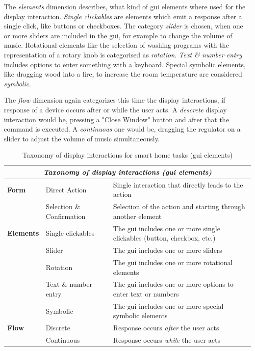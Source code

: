 \documentclass[sigchi]{acmart}
\begin{document}
	The \textit{elements} dimension describes, what kind of \ac{gui} elements where used for the display interaction. \textit{Single clickables} are elements which emit a response after a single click, like buttons or checkboxes. The category \textit{slider} is chosen, when one or more sliders are included in the \ac{gui}, for example to change the volume of music. Rotational elements like the selection of washing programs with the representation of a rotary knob is categorised as \textit{rotation}. \textit{Text \& number entry} includes options to enter something with a keyboard. Special symbolic elements, like dragging wood into a fire, to increase the room temperature are considered \textit{symbolic}.
	
	The \textit{flow} dimension again categorizes this time the display interactions, if response of a device occurs after or while the user acts. A \textit{descrete} display interaction would be, pressing a "Close Window" button and after that the command is executed. A \textit{continuous} one would be, dragging the regulator on a slider to adjust the volume of music simultaneously.
	\begin{table}[t]
		\begin{center}
			\caption{Taxonomy of display interactions for smart home tasks (\ac{gui} elements)}
			\label{tab:taxDisplayGUI}
			\begin{footnotesize}				
				\begin{tabular}{p{0.2\columnwidth} p{} p{}} \toprule
					\multicolumn{3}{c}{\textit{Taxonomy of display interactions (\ac{gui} elements)}} \\ \midrule
					\textbf{Form}		& Direct Action				& Single interaction that directly leads to the action \\
										& Selection \& Confirmation	& Selection of the action and starting through another element\\ \midrule
					\textbf{Elements} 	& Single clickables			& The \ac{gui} includes one or more single clickables 
																	  (button, checkbox, etc.) \\
										& Slider					& The \ac{gui} includes one or more sliders \\
										& Rotation					& The \ac{gui} includes one or more rotational elements \\ 
										& Text \& number entry		& The \ac{gui} includes one or more options to enter text or numbers \\
										& Symbolic					& The \ac{gui} includes one or more special symbolic elements\\ \midrule
					\textbf{Flow}		& Discrete					& Response occurs \textit{after} the user acts \\ 
										& Continuous 				& Response occurs \textit{while} the user acts  \\ \bottomrule
				\end{tabular}
			\end{footnotesize}	
		\end{center}
	\end{table}	
\end{document}

